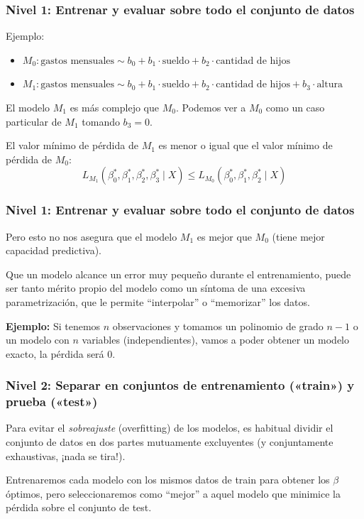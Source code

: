 \documentclass[aspectratio=169,12pt]{beamer}
\begin{document}

\begin{frame}
\frametitle{Nivel 1: Entrenar y evaluar sobre todo el conjunto de datos}

Ejemplo:
\begin{itemize}
\item $M_0: \text{gastos mensuales} \sim b_0 + b_1 \cdot \text{sueldo} + b_2 \cdot \text{cantidad de hijos}$
\item $M_1: \text{gastos mensuales} \sim b_0 + b_1 \cdot \text{sueldo} + b_2 \cdot \text{cantidad de hijos} + b_3 \cdot \text{altura}$
\end{itemize}

El modelo $M_1$ es m\'as complejo que $M_0$. Podemos ver a $M_0$ como un caso particular de $M_1$ tomando $b_3 = 0$.

El valor mínimo de pérdida de $M_1$ es menor o igual que el valor mínimo de pérdida de $M_0$:
$$
L_{M_1}(\beta_0^*,\beta_1^*,\beta_2^*,\beta_3^* \mid X) \le L_{M_0}(\beta_0^*,\beta_1^*,\beta_2^* \mid X)
$$

\end{frame}



\begin{frame}
\frametitle{Nivel 1: Entrenar y evaluar sobre todo el conjunto de datos}

Pero esto no nos asegura que el modelo $M_1$ es mejor que $M_0$ (tiene mejor capacidad predictiva).

Que un modelo alcance un error muy pequeño durante el entrenamiento, puede ser tanto mérito propio del modelo como un síntoma de una excesiva parametrización, que le permite ``interpolar'' o ``memorizar'' los datos.

\textbf{Ejemplo:} Si tenemos $n$ observaciones y tomamos un polinomio de grado $n-1$ o un modelo con $n$ variables (independientes), vamos a poder obtener un modelo exacto, la pérdida será 0.

\end{frame}


\begin{frame}
\frametitle{Nivel 2: Separar en conjuntos de entrenamiento («train») y prueba («test»)}

Para evitar el \emph{sobreajuste} (overfitting) de los modelos, es habitual dividir el conjunto
de datos en dos partes mutuamente excluyentes (y conjuntamente exhaustivas, ¡nada
se tira!).

Entrenaremos cada modelo con los mismos datos de train para obtener los $\beta$
óptimos, pero seleccionaremos como ``mejor'' a aquel modelo que minimice la pérdida  sobre el conjunto de test.


\end{frame}
\end{document}
